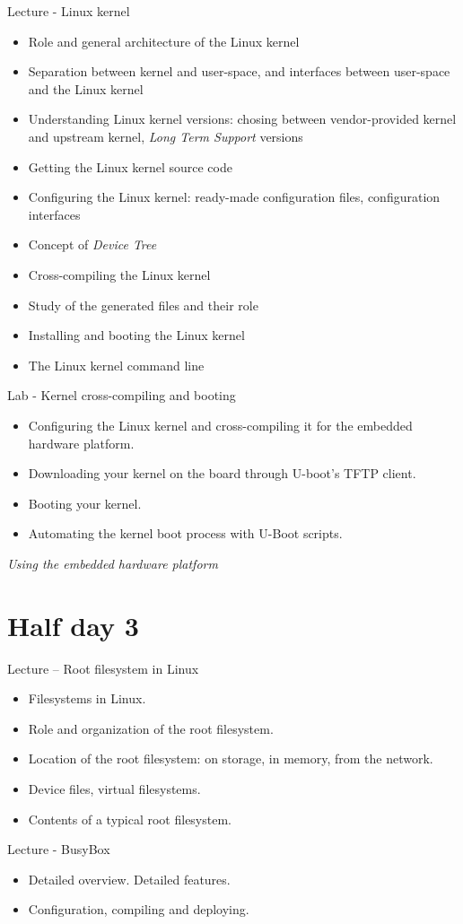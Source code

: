 \documentclass[a4paper,12pt,obeyspaces,spaces,hyphens]{article}
\begin{document}
\feagendatwocolumn
{Lecture - Linux kernel}
{
  \begin{itemize}
  \item Role and general architecture of the Linux kernel
  \item Separation between kernel and user-space, and interfaces
    between user-space and the Linux kernel
  \item Understanding Linux kernel versions: chosing between
    vendor-provided kernel and upstream kernel, {\em Long Term
      Support} versions
  \item Getting the Linux kernel source code
  \item Configuring the Linux kernel: ready-made configuration files,
    configuration interfaces
  \item Concept of {\em Device Tree}
  \item Cross-compiling the Linux kernel
  \item Study of the generated files and their role
  \item Installing and booting the Linux kernel
  \item The Linux kernel command line
  \end{itemize}
}
{Lab - Kernel cross-compiling and booting}
{
  \begin{itemize}
  \item Configuring the Linux kernel and cross-compiling it for the
    embedded hardware platform.
  \item Downloading your kernel on the board through U-boot's TFTP
    client.
  \item Booting your kernel.
  \item Automating the kernel boot process with U-Boot scripts.
  \end{itemize}

  \vspace{0.5cm}
  {\em Using the embedded hardware platform}
}

\section{Half day 3}

\feagendatwocolumn
{Lecture – Root filesystem in Linux}
{
  \begin{itemize}
  \item Filesystems in Linux.
  \item Role and organization of the root filesystem.
  \item Location of the root filesystem: on storage, in memory,
        from the network.
  \item Device files, virtual filesystems.
  \item Contents of a typical root filesystem.
  \end{itemize}
}
{Lecture - BusyBox}
{
  \begin{itemize}
  \item Detailed overview. Detailed features.
  \item Configuration, compiling and deploying.
  \end{itemize}
}
\end{document}
